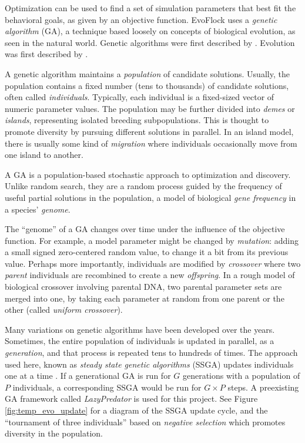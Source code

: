 \documentclass[letterpaper]{article}
\begin{document}
Optimization can be used to find a set of simulation parameters that best fit the behavioral goals, as given by an objective function. EvoFlock uses a \textit{genetic algorithm} (GA), a technique based loosely on concepts of biological evolution, as seen in the natural world. Genetic algorithms were first described by \citet{holland_adaptation_1975}. Evolution was first described by \citet{darwin_origin_1859}.

A genetic algorithm maintains a \textit{population} of candidate solutions. Usually, the population contains a fixed number (tens to thousands) of candidate solutions, often called \textit{individuals}. Typically, each individual is a fixed-sized vector of numeric parameter values. The population may be further divided into \textit{demes} or \textit{islands}, representing isolated breeding subpopulations. This is thought to promote diversity by pursuing different solutions in parallel. In an island model, there is usually some kind of \textit{migration} where individuals occasionally move from one island to another.

A GA is a population-based stochastic approach to optimization and discovery. Unlike random search, they are a random process guided by the frequency of useful partial solutions in the population, a model of biological \textit{gene frequency} in a species' \textit{genome}.

The ``genome'' of a GA changes over time under the influence of the objective function. For example, a model parameter might be changed by \textit{mutation}: adding a small signed zero-centered random value, to change it a bit from its previous value. Perhaps more importantly, individuals are modified by \textit{crossover} where two \textit{parent} individuals are recombined to create a new \textit{offspring}. In a rough model of biological crossover involving parental DNA, two parental parameter sets are merged into one, by taking each parameter at random from one parent or the other (called \textit{uniform crossover}).

Many variations on genetic algorithms have been developed over the years. Sometimes, the entire population of individuals is updated in parallel, as a \textit{generation}, and that process is repeated tens to hundreds of times. The approach used here, known as \textit{steady state genetic algorithms} (SSGA) updates individuals one at a time \citep{syswerda_study_1991}. If a generational GA is run for $G$ generations with a population of $P$ individuals, a corresponding SSGA would be run for $G{\times}P$ steps. A preexisting GA framework called \textit{LazyPredator} is used for this project. See Figure \ref{fig:temp_evo_update} for a diagram of the SSGA update cycle, and the ``tournament of three individuals'' based on \textit{negative selection} which promotes diversity in the population.
\end{document}

